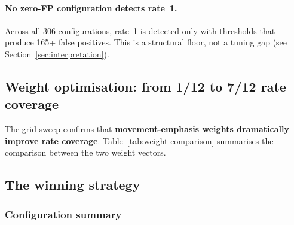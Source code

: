 \documentclass[10pt,twocolumn]{article}
\begin{document}
\paragraph{No zero-FP configuration detects rate~1.}
Across all 306 configurations, rate~1 is detected only with thresholds that
produce 165+ false positives.  This is a structural floor, not a tuning gap
(see Section~\ref{sec:interpretation}).

\subsection{Weight optimisation: from 1/12 to 7/12 rate coverage}
\label{sec:weight-opt}

The grid sweep confirms that \textbf{movement-emphasis weights dramatically
improve rate coverage}.  Table~\ref{tab:weight-comparison} summarises the
comparison between the two weight vectors.

\begin{table}[htbp]
\centering
\caption{Weight optimisation impact on rate coverage.  Both configurations
are evaluated on the same 12 injection rates (1--100~events/hr).
The movement-emphasis configuration (persistence + coherence = 0.65)
increases detection from 1/12 to 7/12 compared to the position-emphasis
configuration (displacement + surprise = 0.45).  Both produce zero clean
false positives.}
\label{tab:weight-comparison}
\end{table}

\subsection{The winning strategy}
\label{sec:winner}

\subsubsection{Configuration summary}
\end{document}
